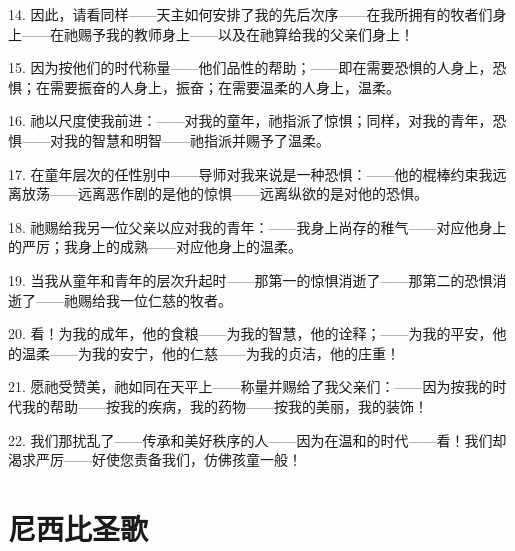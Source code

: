 14. 因此，请看同样——天主如何安排了我的先后次序——在我所拥有的牧者们身上——在祂赐予我的教师身上——以及在祂算给我的父亲们身上！\par

15. 因为按他们的时代称量——他们品性的帮助；——即在需要恐惧的人身上，恐惧；在需要振奋的人身上，振奋；在需要温柔的人身上，温柔。\par

16. 祂以尺度使我前进：——对我的童年，祂指派了惊惧；同样，对我的青年，恐惧——对我的智慧和明智——祂指派并赐予了温柔。\par

17. 在童年层次的任性别中——导师对我来说是一种恐惧：——他的棍棒约束我远离放荡——远离恶作剧的是他的惊惧——远离纵欲的是对他的恐惧。\par

18. 祂赐给我另一位父亲以应对我的青年：——我身上尚存的稚气——对应他身上的严厉；我身上的成熟——对应他身上的温柔。\par

19. 当我从童年和青年的层次升起时——那第一的惊惧消逝了——那第二的恐惧消逝了——祂赐给我一位仁慈的牧者。\par

20. 看！为我的成年，他的食粮——为我的智慧，他的诠释；——为我的平安，他的温柔——为我的安宁，他的仁慈——为我的贞洁，他的庄重！\par

21. 愿祂受赞美，祂如同在天平上——称量并赐给了我父亲们：——因为按我的时代我的帮助——按我的疾病，我的药物——按我的美丽，我的装饰！\par

22. 我们那扰乱了——传承和美好秩序的人——因为在温和的时代——看！我们却渴求严厉——好使您责备我们，仿佛孩童一般！\par



\section{尼西比圣歌}


